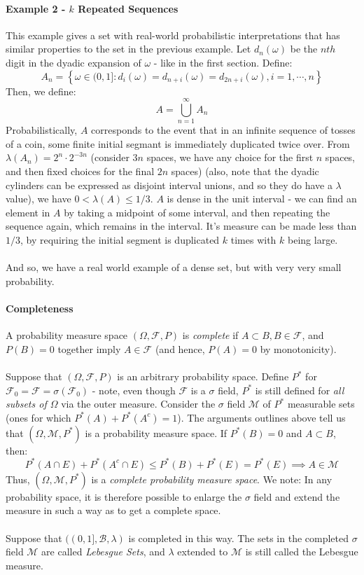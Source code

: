 \documentclass[12pt,a4paper]{article}
\newcommand{\1}[1]{\mathbbm{1}\left\{ #1 \right\}}
\newcommand{\fcal}{\mathcal{F}}
\newcommand{\bcal}{\mathcal{B}}
\newcommand{\mcal}{\mathcal{M}}
\begin{document}
\paragraph{Example 2 - $k$ Repeated Sequences} This example gives a set with real-world probabilistic interpretations that has similar properties to the set in the previous example. Let $d_n(\omega)$ be the $nth$ digit in the dyadic expansion of $\omega$ - like in the first section. Define:
$$
	A_n = \left\{\omega \in (0,1] : d_i(\omega) = d_{n+i}(\omega) = d_{2n + i}(\omega), i = 1, \cdots, n\right\}
$$
Then, we define:
$$
	A = \bigcup_{n=1}^\infty A_n
$$
Probabilistically, $A$ corresponds to the event that in an infinite sequence of tosses of a coin, some finite initial segmant is immediately duplicated twice over. From $\lambda(A_n) = 2^n \cdot 2^{-3n}$ (consider $3n$ spaces, we have any choice for the first $n$ spaces, and then fixed choices for the final $2n$ spaces) (also, note that the dyadic cylinders can be expressed as disjoint interval unions, and so they do have a $\lambda$ value), we have $0 < \lambda(A) \leq 1/3$. $A$ is dense in the unit interval - we can find an element in $A$ by taking a midpoint of some interval, and then repeating the sequence again, which remains in the interval. It's measure can be made less than $1/3$, by requiring the initial segment is duplicated $k$ times with $k$ being large.
\\\\
And so, we have a real world example of a dense set, but with very very small probability.

\paragraph{Completeness} A probability measure space $(\Omega,\fcal,P)$ is \textit{complete} if $A \subset B, B \in \fcal$, and $P(B) = 0$ together imply $A \in \fcal$ (and hence, $P(A) = 0$ by monotonicity).
\\\\
Suppose that $(\Omega,\fcal,P)$ is an arbitrary probability space. Define $P^*$ for $\fcal_0 = \fcal = \sigma(\fcal_0)$ - note, even though $\fcal$ is a $\sigma$ field, $P^*$ is still defined for \textit{all subsets of $\Omega$} via the outer measure. Consider the $\sigma$ field $\mcal$ of $P^*$ measurable sets (ones for which $P^*(A) + P^*(A^c) = 1$). The arguments outlines above tell us that $(\Omega,\mcal,P^*)$ is a probability measure space. If $P^*(B) = 0$ and $A \subset B$, then:
$$
	P^*(A \cap E) + P^*(A^c \cap E) \leq P^*(B) + P^*(E) = P^*(E) \implies A \in \mcal
$$
Thus, $(\Omega,\mcal,P^*)$ is a \textit{complete probability measure space}. We note: In any probability space, it is therefore possible to enlarge the $\sigma$ field and extend the measure in such a way as to get a complete space.
\\\\
Suppose that $((0,1],\bcal,\lambda)$ is completed in this way. The sets in the completed $\sigma$ field $\mcal$ are called \textit{Lebesgue Sets}, and $\lambda$ extended to $\mcal$ is still called the Lebesgue measure.
\end{document}
